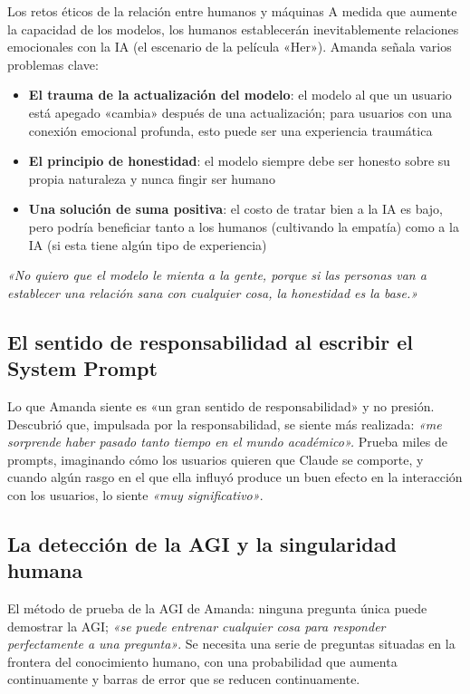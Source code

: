 \begin{warningbox}{Los retos éticos de la relación entre humanos y máquinas}
A medida que aumente la capacidad de los modelos, los humanos establecerán inevitablemente relaciones emocionales con la IA (el escenario de la película «Her»). Amanda señala varios problemas clave:

\begin{itemize}
    \item \textbf{El trauma de la actualización del modelo}: el modelo al que un usuario está apegado «cambia» después de una actualización; para usuarios con una conexión emocional profunda, esto puede ser una experiencia traumática
    \item \textbf{El principio de honestidad}: el modelo siempre debe ser honesto sobre su propia naturaleza y nunca fingir ser humano
    \item \textbf{Una solución de suma positiva}: el costo de tratar bien a la IA es bajo, pero podría beneficiar tanto a los humanos (cultivando la empatía) como a la IA (si esta tiene algún tipo de experiencia)
\end{itemize}

\textit{«No quiero que el modelo le mienta a la gente, porque si las personas van a establecer una relación sana con cualquier cosa, la honestidad es la base.»}
\end{warningbox}

\subsection{El sentido de responsabilidad al escribir el System Prompt}

Lo que Amanda siente es «un gran sentido de responsabilidad» y no presión. Descubrió que, impulsada por la responsabilidad, se siente más realizada: \textit{«me sorprende haber pasado tanto tiempo en el mundo académico».} Prueba miles de prompts, imaginando cómo los usuarios quieren que Claude se comporte, y cuando algún rasgo en el que ella influyó produce un buen efecto en la interacción con los usuarios, lo siente \textit{«muy significativo»}.

\subsection{La detección de la AGI y la singularidad humana}

El método de prueba de la AGI de Amanda: ninguna pregunta única puede demostrar la AGI; \textit{«se puede entrenar cualquier cosa para responder perfectamente a una pregunta»}. Se necesita una serie de preguntas situadas en la frontera del conocimiento humano, con una probabilidad que aumenta continuamente y barras de error que se reducen continuamente.

